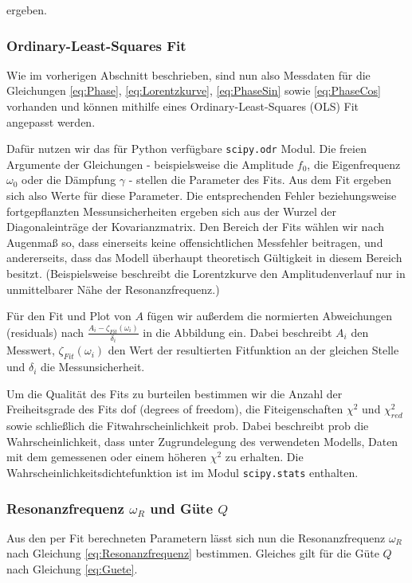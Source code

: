 ergeben.

\subsubsection*{Ordinary-Least-Squares Fit}

Wie im vorherigen Abschnitt beschrieben, sind nun also Messdaten für die Gleichungen \ref{eq:Phase}, \ref{eq:Lorentzkurve}, \ref{eq:PhaseSin} sowie \ref{eq:PhaseCos} vorhanden und können mithilfe eines Ordinary-Least-Squares (OLS) Fit angepasst werden.

Dafür nutzen wir das für Python verfügbare \texttt{scipy.odr} Modul.
Die freien Argumente der Gleichungen - beispielsweise die Amplitude $f_0$, die Eigenfrequenz $\omega_0$ oder die Dämpfung $\gamma$ - stellen die Parameter des Fits.
Aus dem Fit ergeben sich also Werte für diese Parameter.
Die entsprechenden Fehler beziehungsweise fortgepflanzten Messunsicherheiten ergeben sich aus der Wurzel der Diagonaleinträge der Kovarianzmatrix.
Den Bereich der Fits wählen wir nach Augenmaß so, dass einerseits keine offensichtlichen Messfehler beitragen, und andererseits, dass das Modell überhaupt theoretisch Gültigkeit in diesem Bereich besitzt.
(Beispielsweise beschreibt die Lorentzkurve den Amplitudenverlauf nur in unmittelbarer Nähe der Resonanzfrequenz.)

Für den Fit und Plot von $A$ fügen wir außerdem die normierten Abweichungen (residuals) nach $\frac{A_i - \zeta_{Fit}(\omega_i)}{\delta_i}$ in die Abbildung ein.
Dabei beschreibt $A_i$ den Messwert, $\zeta_{Fit}(\omega_i)$ den Wert der resultierten Fitfunktion an der gleichen Stelle und $\delta_i$ die Messunsicherheit.

Um die Qualität des Fits zu burteilen bestimmen wir die Anzahl der Freiheitsgrade des Fits dof (degrees of freedom), die Fiteigenschaften $\chi^2$ und $\chi^2_{red}$ sowie schließlich die Fitwahrscheinlichkeit prob.
Dabei beschreibt prob die Wahrscheinlichkeit, dass unter Zugrundelegung des verwendeten Modells, Daten mit dem gemessenen oder einem höheren $\chi^2$ zu erhalten.
Die Wahrscheinlichkeitsdichtefunktion ist im Modul \texttt{scipy.stats} enthalten.

\subsubsection*{Resonanzfrequenz $\omega_R$ und Güte $Q$}

Aus den per Fit berechneten Parametern lässt sich nun die Resonanzfrequenz $\omega_R$ nach Gleichung \ref{eq:Resonanzfrequenz} bestimmen.
Gleiches gilt für die Güte $Q$ nach Gleichung \ref{eq:Guete}.

